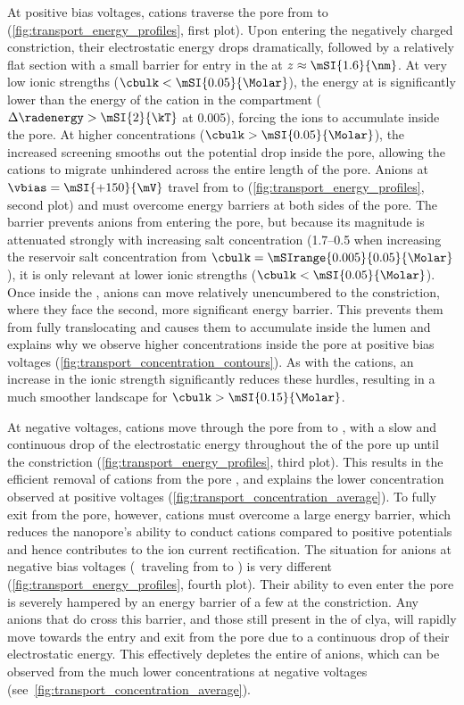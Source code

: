 At positive bias voltages, cations traverse the pore from \transi{} to \cisi{}
(\cref{fig:transport_energy_profiles}, first plot). Upon entering the negatively charged constriction, their
electrostatic energy drops dramatically, followed by a relatively flat section with a small barrier for entry
in the \lumen{} at $z \approx \mSI{1.6}{\nm}$. At very low ionic strengths ($\cbulk < \mSI{0.05}{\Molar}$),
the energy at \transi{} is significantly lower than the energy of the cation in the \cisi{} compartment
(\eg~$\Delta\radenergy > \mSI{2}{\kT}$ at \SI{0.005}{\Molar}), forcing the ions to accumulate inside the pore.
At higher concentrations ($\cbulk > \mSI{0.05}{\Molar}$), the increased screening smooths out the potential
drop inside the pore, allowing the cations to migrate unhindered across the entire length of the pore. Anions
at $\vbias = \mSI{+150}{\mV}$ travel from \cisi{} to \transi{} (\cref{fig:transport_energy_profiles}, second
plot) and must overcome energy barriers at both sides of the pore. The \cisi{} barrier prevents anions from
entering the pore, but because its magnitude is attenuated strongly with increasing salt concentration
(\SIrange{1.7}{0.5}{\kT} when increasing the reservoir salt concentration from $\cbulk =
\mSIrange{0.005}{0.05}{\Molar}$), it is only relevant at lower ionic strengths ($\cbulk <
\mSI{0.05}{\Molar}$). Once inside the \lumen{}, anions can move relatively unencumbered to the \transi{}
constriction, where they face the second, more significant energy barrier. This prevents them from fully
translocating and causes them to accumulate inside the lumen and explains why we observe higher \Cl{}
concentrations inside the pore at positive bias voltages (\cref{fig:transport_concentration_contours}). As
with the cations, an increase in the ionic strength significantly reduces these hurdles, resulting in a much
smoother landscape for $\cbulk > \mSI{0.15}{\Molar}$.

At negative voltages, cations move through the pore from \cisi{} to \transi{}, with a slow and continuous drop
of the electrostatic energy throughout the \lumen{} of the pore up until the constriction
(\cref{fig:transport_energy_profiles}, third plot). This results in the efficient removal of cations from the
pore \lumen{}, and explains the lower \Na{} concentration observed at positive voltages
(\cref{fig:transport_concentration_average}). To fully exit from the pore, however, cations must overcome a
large energy barrier, which reduces the nanopore's ability to conduct cations compared to positive potentials
and hence contributes to the ion current rectification. The situation for anions at negative bias voltages
(\ie~traveling from \transi{} to \cisi{}) is very different (\cref{fig:transport_energy_profiles}, fourth
plot). Their ability to even enter the pore is severely hampered by an energy barrier of a few \si{\kT} at the
\transi{} constriction. Any anions that do cross this barrier, and those still present in the \lumen{} of
\gls{clya}, will rapidly move towards the \cisi{} entry and exit from the pore due to a continuous drop of
their electrostatic energy. This effectively depletes the entire \lumen{} of anions, which can be observed
from the much lower \Cl{} concentrations at negative voltages
(see~\cref{fig:transport_concentration_average}).

